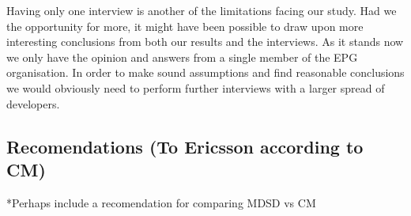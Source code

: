 \documentclass[final_report_innit.tex]{subfiles}
\begin{document}
Having only one interview is another of the limitations facing our study. Had we the opportunity for more, it might have been possible to draw upon more interesting conclusions from both our results and the interviews. As it stands now we only have the opinion and answers from a single member of the EPG organisation. In order to make sound assumptions and find reasonable conclusions we would obviously need to perform further interviews with a larger spread of developers.

\subsection*{Recomendations (To Ericsson according to CM)}

*Perhaps include a recomendation for comparing MDSD vs CM
\end{document}
